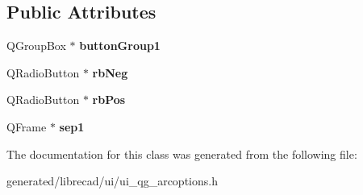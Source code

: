 \subsection*{Public Attributes}
\begin{DoxyCompactItemize}
\item 
\hypertarget{classUi__QG__ArcOptions_ad744fb06783438d0327ae24a8e9e7019}{Q\-Group\-Box $\ast$ {\bfseries button\-Group1}}\label{classUi__QG__ArcOptions_ad744fb06783438d0327ae24a8e9e7019}

\item 
\hypertarget{classUi__QG__ArcOptions_a861a31d52640d089bc6c307aa73f2593}{Q\-Radio\-Button $\ast$ {\bfseries rb\-Neg}}\label{classUi__QG__ArcOptions_a861a31d52640d089bc6c307aa73f2593}

\item 
\hypertarget{classUi__QG__ArcOptions_a265b737b3976b6571c27f28a816a6d79}{Q\-Radio\-Button $\ast$ {\bfseries rb\-Pos}}\label{classUi__QG__ArcOptions_a265b737b3976b6571c27f28a816a6d79}

\item 
\hypertarget{classUi__QG__ArcOptions_a64a89f0fe7992310af1e5b8231b6bcbc}{Q\-Frame $\ast$ {\bfseries sep1}}\label{classUi__QG__ArcOptions_a64a89f0fe7992310af1e5b8231b6bcbc}

\end{DoxyCompactItemize}


The documentation for this class was generated from the following file\-:\begin{DoxyCompactItemize}
\item 
generated/librecad/ui/ui\-\_\-qg\-\_\-arcoptions.\-h\end{DoxyCompactItemize}
